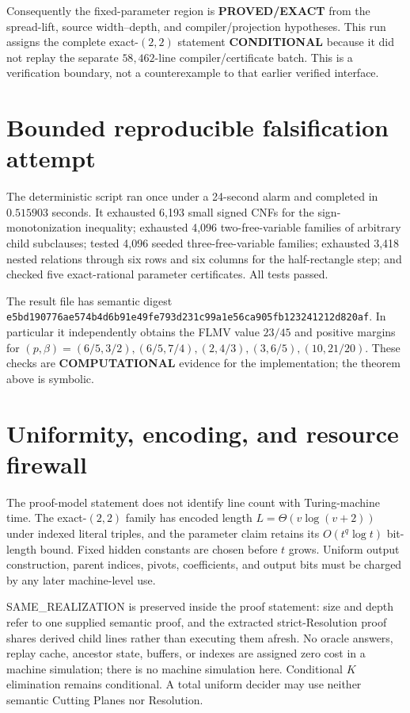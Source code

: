 \documentclass[11pt]{article}
\newcommand{\EXACT}{\textbf{PROVED/EXACT}}
\newcommand{\COMP}{\textbf{COMPUTATIONAL}}
\newcommand{\COND}{\textbf{CONDITIONAL}}
\begin{document}
Consequently the fixed-parameter region is \EXACT{} from the spread-lift,
source width--depth, and compiler/projection hypotheses.  This run assigns
the complete exact-$(2,2)$ statement \COND{} because it did not replay the
separate $58{,}462$-line compiler/certificate batch.  This is a verification
boundary, not a counterexample to that earlier verified interface.

\section{Bounded reproducible falsification attempt}
The deterministic script
ran once under a 24-second alarm and completed in $0.515903$ seconds.  It
exhausted 6,193 small signed CNFs for the sign-monotonization inequality;
exhausted 4,096 two-free-variable families of arbitrary child subclauses;
tested 4,096 seeded three-free-variable families; exhausted 3,418 nested
relations through six rows and six columns for the half-rectangle step; and
checked five exact-rational parameter certificates.  All tests passed.

The result file
has semantic digest
\texttt{e5bd190776ae574b4d6b91e49fe793d231c99a1e56ca905fb123241212d820af}.
In particular it independently obtains the FLMV value $23/45$ and positive
margins for $(p,\beta)=(6/5,3/2),(6/5,7/4),(2,4/3),(3,6/5),(10,21/20)$.
These checks are \COMP{} evidence for the implementation; the theorem above
is symbolic.

\section{Uniformity, encoding, and resource firewall}
The proof-model statement does not identify line count with Turing-machine
time.  The exact-$(2,2)$ family has encoded length
$L=\Theta(v\log(v+2))$ under indexed literal triples, and the parameter
claim retains its $O(t^q\log t)$ bit-length bound.  Fixed hidden constants
are chosen before $t$ grows.  Uniform output construction, parent indices,
pivots, coefficients, and output bits must be charged by any later
machine-level use.

SAME\_REALIZATION is preserved inside the proof statement: size and depth
refer to one supplied semantic proof, and the extracted strict-Resolution
proof shares derived child lines rather than executing them afresh.  No
oracle answers, replay cache, ancestor state, buffers, or indexes are
assigned zero cost in a machine simulation; there is no machine simulation
here.  Conditional $K$ elimination remains conditional.  A total uniform
decider may use neither semantic Cutting Planes nor Resolution.
\end{document}
